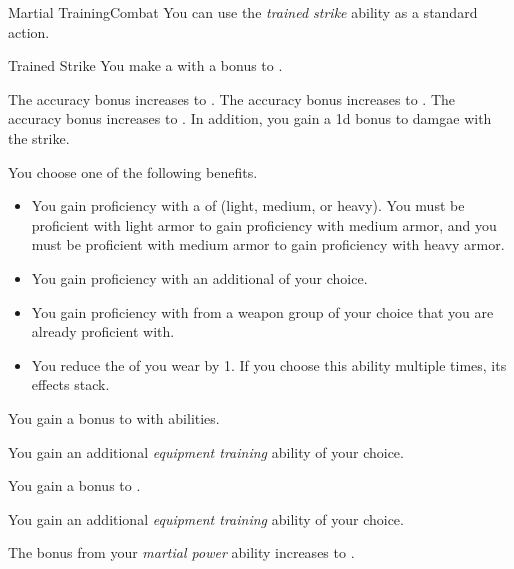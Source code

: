     \begin{feat}{Martial Training}{Combat}
         You can use the \textit{trained strike} ability as a standard action.
        \begin{freeability}{Trained Strike}
            You make a  with a  bonus to .

            \rankline
             The accuracy bonus increases to .
             The accuracy bonus increases to .
             The accuracy bonus increases to .
                In addition, you gain a \plus1d bonus to damgae with the strike.
        \end{freeability}

         You choose one of the following benefits.
        \begin{itemize}
            \item You gain proficiency with a  of  (light, medium, or heavy).
                You must be proficient with light armor to gain proficiency with medium armor, and you must be proficient with medium armor to gain proficiency with heavy armor.
            \item You gain proficiency with an additional  of your choice.
            \item You gain proficiency with  from a weapon group of your choice that you are already proficient with.
            \item You reduce the  of  you wear by 1.
                If you choose this ability multiple times, its effects stack.
        \end{itemize}

         You gain a  bonus to  with  abilities.

         You gain an additional \textit{equipment training} ability of your choice.

         You gain a  bonus to .

         You gain an additional \textit{equipment training} ability of your choice.

         The bonus from your \textit{martial power} ability increases to .
    \end{feat}


